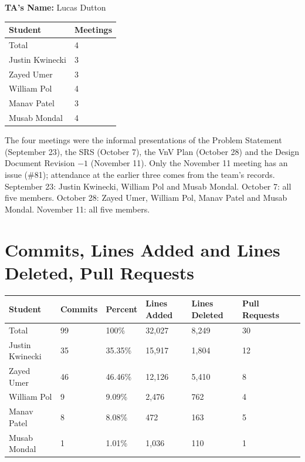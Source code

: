 \documentclass{article}
\begin{document}
\noindent \textbf{TA's Name: } Lucas Dutton

\begin{table}[H]
\centering
\begin{tabular}{ll}
\toprule
\textbf{Student} & \textbf{Meetings}\\
\midrule
Total & 4\\
Justin Kwinecki & 3\\
Zayed Umer & 3\\
William Pol & 4\\
Manav Patel & 3\\
Musab Mondal & 4\\
\bottomrule
\end{tabular}
\end{table}

The four meetings were the informal presentations of the Problem Statement
(September 23), the SRS (October 7), the VnV Plan (October 28) and the Design
Document Revision $-1$ (November 11). Only the November 11 meeting has an
issue (\#81); attendance at the earlier three comes from the team's records.
September 23: Justin Kwinecki, William Pol and Musab Mondal. October 7: all
five members. October 28: Zayed Umer, William Pol, Manav Patel and Musab Mondal. November
11: all five members.

\section{Commits, Lines Added and Lines Deleted, Pull Requests}

\begin{table}[H]
\centering
\small
\setlength{\tabcolsep}{1.25pt}
\begin{tabular}{lllllll}
\toprule
\textbf{Student} & \textbf{Commits} & \textbf{Percent} & \textbf{Lines Added} &
\textbf{Lines Deleted} & \textbf{Pull Requests}\\
\midrule
Total & 99 & 100\% & 32,027 & 8,249 & 30\\
Justin Kwinecki & 35 & 35.35\% & 15,917 & 1,804 & 12\\
Zayed Umer & 46 & 46.46\% & 12,126 & 5,410 & 8\\
William Pol & 9 & 9.09\% & 2,476 & 762 & 4\\
Manav Patel & 8 & 8.08\% & 472 & 163 & 5\\
Musab Mondal & 1 & 1.01\% & 1,036 & 110 & 1\\
\bottomrule
\end{tabular}
\end{table}
\end{document}
